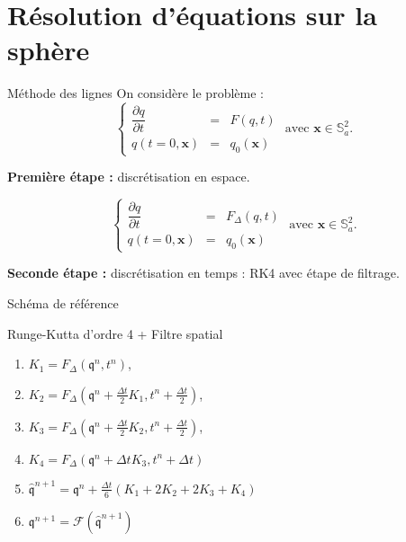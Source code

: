 \documentclass[11pt]{beamer}
\begin{document}
\section{Résolution d'équations sur la sphère}
\begin{frame}{Méthode des lignes}
On considère le problème :
$$
\left\lbrace
\begin{array}{rcl}
\dfrac{\partial q}{\partial t} & = & F(q,t) \\
q(t=0,\mathbf{x}) & = & q_0(\mathbf{x})
\end{array}
\right. \text{ avec } \mathbf{x} \in \mathbb{S}_a^2.
$$
\begin{block}{}
\textbf{Première étape : } discrétisation en espace.
\end{block}
$$
\left\lbrace
\begin{array}{rcl}
\dfrac{\partial q}{\partial t} & = & F_{\Delta}(q,t) \\
q(t=0,\mathbf{x}) & = & q_0(\mathbf{x})
\end{array}
\right. \text{ avec } \mathbf{x} \in \mathbb{S}_a^2.
$$
\begin{block}{}
\textbf{Seconde étape : } discrétisation en temps : RK4 avec étape de filtrage.
\end{block}
\end{frame}






\begin{frame}{Schéma de référence}
\begin{block}{Runge-Kutta d'ordre 4 + Filtre spatial
}
\begin{enumerate}
\item $K_1 = F_{\Delta}(\mathfrak{q}^n, t^n)$,
\item $K_2 = F_{\Delta}(\mathfrak{q}^n + \frac{\Delta t}{2} K_1, t^n + \frac{\Delta t}{2})$,
\item $K_3 = F_{\Delta}(\mathfrak{q}^n + \frac{\Delta t}{2} K_2, t^n + \frac{\Delta t}{2})$,
\item $K_4 = F_{\Delta}(\mathfrak{q}^n + \Delta t K_3, t^n + \Delta t)$
\item $\hat{\mathfrak{q}}^{n+1} = \mathfrak{q}^n + \frac{\Delta t}{6} \left( K_1 + 2 K_2 + 2 K_3 + K_4 \right)$
\item $\mathfrak{q}^{n+1} = \mathcal{F}(\hat{\mathfrak{q}}^{n+1})$
\end{enumerate}
\end{block}
\end{frame}
\end{document}
